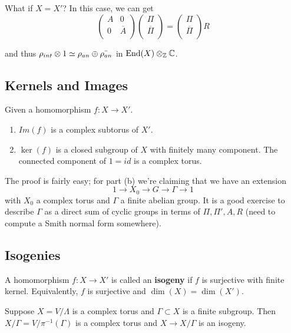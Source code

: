 What if $X=X'$? In this case, we can get 
$$\left(
\begin{array}{cc}
A & 0\\
0 & \overline{A}\\
\end{array}\right)
\left(
\begin{array}{c}
\Pi\\
\overline{\Pi}\\
\end{array}
\right)=\left(
\begin{array}{c}
\Pi\\
\overline{\Pi}\\
\end{array}
\right)R$$

and thus 
$\rho_{int}\otimes 1\simeq \rho_{an}\oplus \bar{\rho_{an}}$ in $\operatorname{End}(X)\otimes_{\mathbb Z} {\mathbb C}$. 

\subsection{Kernels and Images}
\begin{lemma}
Given a homomorphism $f:X\to X'$. 
\begin{enumerate}
\item $Im(f)$ is a complex subtorus of $X'$.
\item $\ker(f)$ is a closed subgroup of $X$ with finitely many component. The connected component of $1=id$ is a complex torus. 
\end{enumerate}
\end{lemma}

The proof is fairly easy; for part (b) we're claiming that we have an extension 
$$1\to X_0 \to G \to \Gamma \to 1$$
with $X_0$ a complex torus and $\Gamma$ a finite abelian group. It is a good exercise to describe $\Gamma$ as a direct sum of cyclic groups in terms of $\Pi,\Pi',A,R$ (need to compute a Smith normal form somewhere).


\subsection{Isogenies} 

A homomorphism
$f:X\to X'$ is called an \textbf{isogeny} if $f$ is surjective with finite kernel. Equivalently, $f$ is surjective and $\dim(X)=\dim(X')$. 

\begin{example}
Suppose $X=V/\Lambda$ is a complex torus and $\Gamma\subset X$ is a finite subgroup. Then $X/\Gamma=V/\pi^{-1}(\Gamma)$ is a complex torus and $X\to X/\Gamma$ is an isogeny. 
\end{example}


